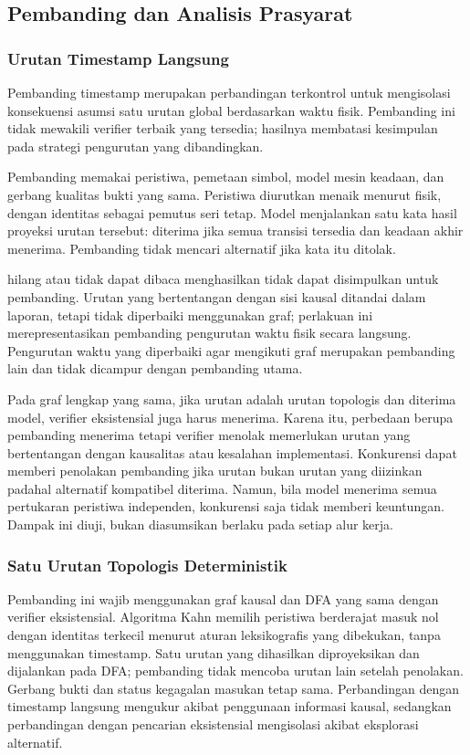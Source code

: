\subsection{Pembanding dan Analisis Prasyarat}
\label{sec:comparators}
\subsubsection{Urutan Timestamp Langsung}
Pembanding timestamp merupakan perbandingan terkontrol untuk mengisolasi konsekuensi asumsi satu urutan global berdasarkan waktu fisik. Pembanding ini tidak mewakili verifier terbaik yang tersedia; hasilnya membatasi kesimpulan pada strategi pengurutan yang dibandingkan.

Pembanding memakai peristiwa, pemetaan simbol, model mesin keadaan, dan gerbang kualitas bukti yang sama. Peristiwa diurutkan menaik menurut  fisik, dengan identitas sebagai pemutus seri tetap. Model menjalankan satu kata hasil proyeksi urutan tersebut: diterima jika semua transisi tersedia dan keadaan akhir menerima. Pembanding tidak mencari alternatif jika kata itu ditolak.

 hilang atau tidak dapat dibaca menghasilkan tidak dapat disimpulkan untuk pembanding. Urutan  yang bertentangan dengan sisi kausal ditandai dalam laporan, tetapi tidak diperbaiki menggunakan graf; perlakuan ini merepresentasikan pembanding pengurutan waktu fisik secara langsung. Pengurutan waktu yang diperbaiki agar mengikuti graf merupakan pembanding lain dan tidak dicampur dengan pembanding utama.

Pada graf lengkap yang sama, jika urutan  adalah urutan topologis dan diterima model, verifier eksistensial juga harus menerima. Karena itu, perbedaan berupa pembanding menerima tetapi verifier menolak memerlukan urutan  yang bertentangan dengan kausalitas atau kesalahan implementasi. Konkurensi dapat memberi penolakan pembanding jika urutan  bukan urutan yang diizinkan padahal alternatif kompatibel diterima. Namun, bila model menerima semua pertukaran peristiwa independen, konkurensi saja tidak memberi keuntungan. Dampak ini diuji, bukan diasumsikan berlaku pada setiap alur kerja.

\subsubsection{Satu Urutan Topologis Deterministik}
Pembanding ini wajib menggunakan graf kausal dan DFA yang sama dengan verifier eksistensial. Algoritma Kahn memilih peristiwa berderajat masuk nol dengan identitas terkecil menurut aturan leksikografis yang dibekukan, tanpa menggunakan timestamp. Satu urutan yang dihasilkan diproyeksikan dan dijalankan pada DFA; pembanding tidak mencoba urutan lain setelah penolakan. Gerbang bukti dan status kegagalan masukan tetap sama. Perbandingan dengan timestamp langsung mengukur akibat penggunaan informasi kausal, sedangkan perbandingan dengan pencarian eksistensial mengisolasi akibat eksplorasi alternatif.

